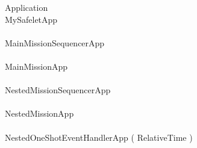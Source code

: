\begin{circus}
\circprocess  Application \circdef \\
\circblockopen
MySafeletApp\\
\interleave\\
MainMissionSequencerApp\\
\interleave \\
		MainMissionApp\\
		\interleave \\
			NestedMissionSequencerApp\\
			
		
		\interleave \\
		NestedMissionApp\\
		\interleave \\
			NestedOneShotEventHandlerApp ( RelativeTime  ) \\
			
		
\circblockclose
\end{circus}
